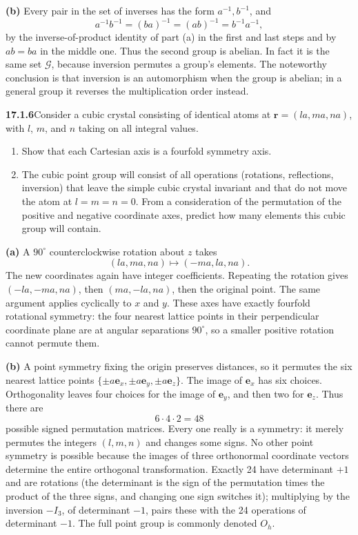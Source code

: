 \textbf{(b)} Every pair in the set of inverses has the form
$a^{-1},b^{-1}$, and
\[
a^{-1}b^{-1}=(ba)^{-1}=(ab)^{-1}=b^{-1}a^{-1},
\]
by the inverse-of-product identity of part (a) in the first and
last steps and by $ab=ba$ in the middle one.
Thus the second group is abelian. In fact it is the same set
$\mathcal G$, because inversion permutes a group's elements.
The noteworthy conclusion is that inversion is an automorphism
when the group is abelian; in a general group it reverses the
multiplication order instead.

\par\bigskip
\noindent\textbf{17.1.6}\quad Consider a cubic crystal consisting of
identical atoms at $\mathbf{r}=(la,ma,na)$, with $l$, $m$, and $n$
taking on all integral values.
\begin{enumerate}
\item[(a)] Show that each Cartesian axis is a fourfold symmetry axis.
\item[(b)] The cubic point group will consist of all operations
(rotations, reflections, inversion) that leave the simple cubic
crystal invariant and that do not move the atom at $l=m=n=0$. From a
consideration of the permutation of the positive and negative
coordinate axes, predict how many elements this cubic group will
contain.
\end{enumerate}
\solution
\textbf{(a)} A $90^\circ$ counterclockwise rotation about $z$
takes
\[
(la,ma,na)\longmapsto(-ma,la,na).
\]
The new coordinates again have integer coefficients.
Repeating the rotation gives $(-la,-ma,na)$, then
$(ma,-la,na)$, then the original point. The same argument
applies cyclically to $x$ and $y$.
These axes have exactly fourfold rotational symmetry: the four
nearest lattice points in their perpendicular coordinate plane
are at angular separations $90^\circ$, so a smaller positive
rotation cannot permute them.

\textbf{(b)} A point symmetry fixing the origin preserves distances,
so it permutes the six nearest lattice points
$\{\pm a\mathbf e_x,\pm a\mathbf e_y,\pm a\mathbf e_z\}$.
The image of $\mathbf e_x$ has six choices.
Orthogonality leaves four choices for the image of $\mathbf e_y$,
and then two for $\mathbf e_z$. Thus there are
\[
\boxed{6\cdot4\cdot2=48}
\]
possible signed permutation matrices.
Every one really is a symmetry: it merely permutes the integers
$(l,m,n)$ and changes some signs. No other point symmetry is
possible because the images of three orthonormal coordinate
vectors determine the entire orthogonal transformation.
Exactly 24 have determinant $+1$ and are rotations (the determinant
is the sign of the permutation times the product of the three signs,
and changing one sign switches it); multiplying by the inversion
$-I_3$, of determinant $-1$, pairs these with the 24 operations of
determinant $-1$.
The full point group is commonly denoted $O_h$.

